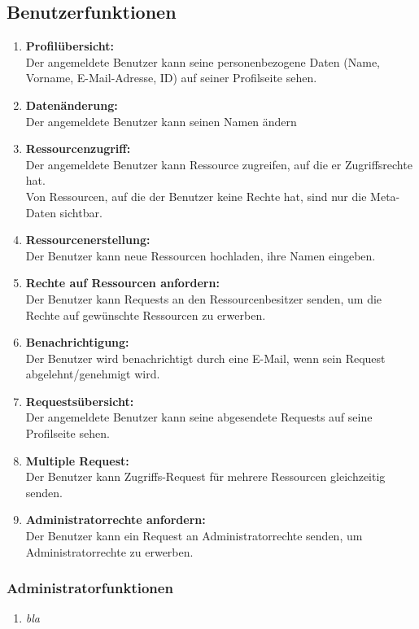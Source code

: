 \documentclass[parskip=full,11pt]{scrartcl}
\def\threedigits#1{%
  \ifnum#1<10 0\fi
  \ifnum#1<1 0\fi
  \number#1}
\begin{document}
\subsection{Benutzerfunktionen}
\begin{enumerate}[label={\textbf{/F\protect\threedigits{\theenumi}0/}}, leftmargin=*]
\item \textbf{Profilübersicht:} \\ Der angemeldete Benutzer kann seine personenbezogene Daten (Name, Vorname, E-Mail-Adresse, ID) auf seiner Profilseite sehen.
\item \textbf{Datenänderung:} \\ Der angemeldete Benutzer kann seinen Namen ändern
\item \textbf{Ressourcenzugriff:} \\Der angemeldete Benutzer kann Ressource zugreifen, auf die er Zugriffsrechte hat.
\\ Von Ressourcen, auf die der Benutzer keine Rechte hat, sind nur die Meta-Daten sichtbar.
\item \textbf{Ressourcenerstellung:}\\ Der Benutzer kann neue Ressourcen hochladen, ihre Namen eingeben.
\item \textbf{Rechte auf Ressourcen anfordern:}\\ Der Benutzer kann Requests an den Ressourcenbesitzer senden, um die Rechte auf gewünschte Ressourcen zu erwerben.
\item \textbf{Benachrichtigung:}\\ Der Benutzer wird benachrichtigt durch eine E-Mail, wenn sein Request abgelehnt/genehmigt wird. 
\item \textbf{Requestsübersicht:}\\ Der angemeldete Benutzer kann seine abgesendete Requests auf seine Profilseite sehen.
\item \colorbox{shadecolor} {\textbf{Multiple Request:}}\\ Der Benutzer kann Zugriffs-Request für mehrere Ressourcen gleichzeitig senden.
\item \colorbox{shadecolor} {\textbf{Administratorrechte anfordern:}}\\ Der Benutzer kann ein Request an Administratorrechte senden, um Administratorrechte zu erwerben.
\end{enumerate}

\subsubsection{Administratorfunktionen}
\begin{enumerate}[label={\textbf{/F\protect\threedigits{\theenumi}0/}}, leftmargin=*, resume]
\item \textit{bla}
\end{enumerate}
\end{document}
